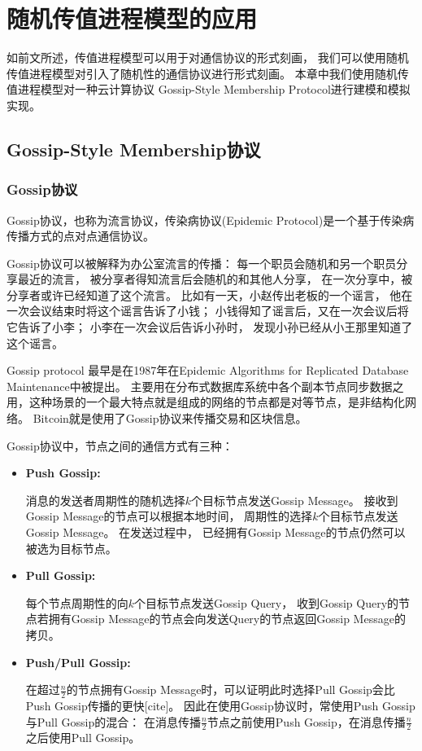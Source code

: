 
\chapter{随机传值进程模型的应用}

如前文所述，传值进程模型可以用于对通信协议的形式刻画，
我们可以使用随机传值进程模型对引入了随机性的通信协议进行形式刻画。
本章中我们使用随机传值进程模型对一种云计算协议
Gossip-Style Membership Protocol进行建模和模拟实现。

\section{Gossip-Style Membership协议}
\subsection{Gossip协议}
Gossip协议，也称为流言协议，传染病协议(Epidemic Protocol)是一个基于传染病传播方式的点对点通信协议。

Gossip协议可以被解释为办公室流言的传播：
每一个职员会随机和另一个职员分享最近的流言，
被分享者得知流言后会随机的和其他人分享，
在一次分享中，被分享者或许已经知道了这个流言。
比如有一天，小赵传出老板的一个谣言，
他在一次会议结束时将这个谣言告诉了小钱；
小钱得知了谣言后，又在一次会议后将它告诉了小李；
小李在一次会议后告诉小孙时，
发现小孙已经从小王那里知道了这个谣言。

Gossip protocol 最早是在1987年在Epidemic Algorithms for Replicated Database Maintenance中被提出。
主要用在分布式数据库系统中各个副本节点同步数据之用，这种场景的一个最大特点就是组成的网络的节点都是对等节点，是非结构化网络。
Bitcoin就是使用了Gossip协议来传播交易和区块信息。

Gossip协议中，节点之间的通信方式有三种：
\begin{itemize}
   \item {
      \textbf{Push Gossip:} 
      
      消息的发送者周期性的随机选择$k$个目标节点发送Gossip Message。
      接收到Gossip Message的节点可以根据本地时间，
      周期性的选择$k$个目标节点发送Gossip Message。
      在发送过程中，
      已经拥有Gossip Message的节点仍然可以被选为目标节点。
   }
   \item {
      \textbf{Pull Gossip:}

      每个节点周期性的向$k$个目标节点发送Gossip Query，
      收到Gossip Query的节点若拥有Gossip Message的节点会向发送Query的节点返回Gossip Message的拷贝。
   }
   \item {
      \textbf{Push/Pull Gossip:}

      在超过$\frac{n}{2}$的节点拥有Gossip Message时，可以证明此时选择Pull Gossip会比Push Gossip传播的更快[cite]。
      因此在使用Gossip协议时，常使用Push Gossip与Pull Gossip的混合：
      在消息传播$\frac{n}{2}$节点之前使用Push Gossip，在消息传播$\frac{n}{2}$之后使用Pull Gossip。
   }
\end{itemize}

